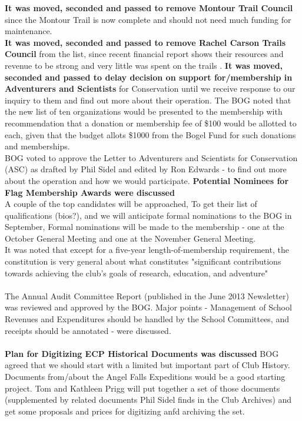 \documentclass[10pt,a4paper]{article}
\begin{document}
\begin{multicols}{2}
\textbf{It was moved, seconded and passed to remove Montour Trail Council }since the Montour Trail is now complete and should not need much funding for maintenance.\\
\textbf{It was moved, seconded and passed to remove Rachel Carson Trails Council} from the list, since recent financial report shows their resources and revenue to be strong and very little was spent on the trails
.
\textbf{It was moved, seconded and passed to delay decision on support for/membership in Adventurers and Scientists} for Conservation until we receive response to our inquiry to them and find out more about their operation.
The BOG noted that the new list of ten organizations would be presented to the membership with recommendation that a donation or membership fee of \$100 would be allotted to each, given that the budget allots \$1000 from the Bogel Fund for such donations and memberships.\\
BOG voted to approve the Letter to Adventurers and Scientists for Conservation (ASC) as drafted by Phil Sidel and edited by Ron Edwards - to find out  more about the operation and how we would participate.
\textbf{Potential Nominees for Flag Membership Awards were discussed}\\  
A couple of the top candidates will be approached,  To get their list of qualifications (bios?), and we will anticipate formal nominations to the BOG in September, Formal nominations will be made to the membership - one at the October General Meeting and one at the November General Meeting.\\
It was noted that except for a five-year length-of-membership requirement, the constitution is very general about what constitutes "significant contributions towards achieving the club's goals of research, education, and adventure"
\\
\\
The Annual Audit Committee Report (published in the June 2013 Newsletter) was reviewed and approved by the BOG.  Major points - Management of School Revenues and Expenditures should be handled by the School Committees, and receipts should be annotated - were discussed.
\\
\\
\textbf{Plan for Digitizing ECP Historical Documents was discussed}
BOG agreed that we should start with a limited but important part of Club History.  Documents from/about the Angel Falls Expeditions would be a good starting project. Tom and Kathleen Prigg will put together a set of those documents (supplemented by related documents Phil Sidel finds in the Club Archives) and get some proposals and prices for digitizing anfd archiving the set.

\end{multicols}
\end{document}
